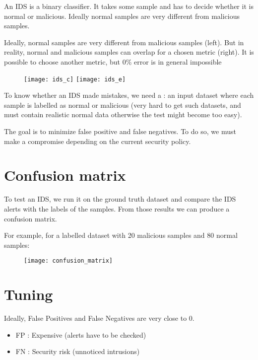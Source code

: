 An IDS is a binary classifier. It takes some sample and has to decide whether it is normal or malicious. Ideally normal samples are very different from malicious samples.

Ideally, normal samples are very different from malicious samples (left). But in reality, normal and malicious samples can overlap for a chosen metric (right). It is possible to choose another metric, but $0$\% error is in general impossible

\begin{figure}[H]
    \centering
    \texttt{[image: ids\_c]}\hfill
    \texttt{[image: ids\_e]}
\end{figure}

To know whether an IDS made mistakes, we need a  : an input dataset where each sample is labelled as normal or malicious (very hard to get such datasets, and must contain realistic normal data otherwise the test might become too easy).

The goal is to minimize false positive and false negatives. To do so, we must make a compromise depending on the current security policy.

\section{Confusion matrix}

To test an IDS, we run it on the ground truth dataset and compare the IDS alerts with the labels of the samples. From those results we can produce a confusion matrix.

For example, for a labelled dataset with 20 malicious samples and 80 normal samples:

\begin{figure}[H]
    \centering
    \texttt{[image: confusion\_matrix]}
\end{figure}

\section{Tuning}

Ideally, False Positives and False Negatives are very close to 0.
\begin{itemize}
    \item FP : Expensive (alerts have to be checked)
    \item FN : Security risk (unnoticed intrusions)
\end{itemize}

